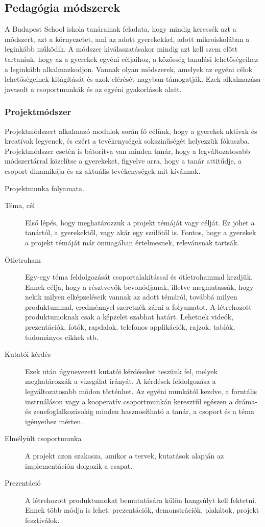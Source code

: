 \hypertarget{pedaguxf3gia-muxf3dszerek}{%
\subsection{Pedagógia módszerek}\label{pedaguxf3gia-muxf3dszerek}}

A Budapest School iskola tanárainak feladata, hogy mindig keressék azt a
módszert, azt a környezetet, ami az adott gyerekekkel, adott
mikroiskolában a leginkább működik. A módszer kiválaszatásakor mindig
azt kell szem előtt tartaniuk, hogy az a gyerekek egyéni céljaihoz, a
közösség tanulási lehetőségeihez a leginkább alkalmazkodjon. Vannak
olyan módszerek, amelyek az egyéni célok lehetőségeinek kitágítását és
azok elérését nagyban támogatják. Ezek alkalmazása javasolt a
csoportmunkák és az egyéni gyakorlások alatt.

\hypertarget{projektmuxf3dszer}{%
\subsubsection{Projektmódszer}\label{projektmuxf3dszer}}

Projektmódszert alkalmazó modulok során fő célünk, hogy a gyerekek
aktivak és kreatívak legyenek, és ezért a tevékenységek sokszinűségét
helyezzük fókuszba. Projektmódszer esetén is bátorítva van minden tanár,
hogy a legváltozatosabb módszertárral közelítse a gyerekeket, figyelve
arra, hogy a tanár attitűdje, a csoport dinamikája és az aktuális
tevékenységek mit kívánnak.

Projektmunka folyamata.

\begin{description}
\item[Téma, cél]
Első lépés, hogy meghatározzuk a projekt témáját vagy célját. Ez jöhet a
tanártól, a gyerekektől, vagy akár egy szülőtől is. Fontos, hogy a
gyerekek a projekt témáját már önmagában értelmesnek, relevánsnak
tartsák.
\item[Ötletroham]
Egy-egy téma feldolgozását csoportalakítással és ötletrohammal kezdjük.
Ennek célja, hogy a résztvevők bevonódjanak, illetve megmutassák, hogy
nekik milyen elképzeléseik vannak az adott témáról, továbbá milyen
produktummal, eredménnyel szeretnék zárni a folyamatot. A létrehozott
produktumoknak csak a képzelet szabhat határt. Lehetnek videók,
prezentációk, fotók, rapdalok, telefonos applikációk, rajzok, tablók,
tudományos cikkek stb.
\item[Kutatói kérdés]
Ezek után úgynevezett kutatói kérdéseket teszünk fel, melyek
meghatározzák a vizsgálat irányát. A kérdések feldolgozása a
legváltozatosabb módon történhet. Az egyéni munkától kezdve, a forntális
instruáláson vagy a kooperatív csoportmunkán keresztűl egészen a dráma-
és zenefoglalkozásokig minden hasznosítható a tanár, a csoport és a téma
igényeihez mérten.
\item[Elmélyült csoportmunka]
A projekt azon szakasza, amikor a tervek, kutatások alapján az
implementáción dolgozik a csapat.
\item[Prezentáció]
A létrehozott produktumokat bemutatására külön hangsúlyt kell fektetni.
Ennek több módja is lehet: prezentációk, demonstrációk, plakátok,
projekt fesztiválok.
\end{description}

